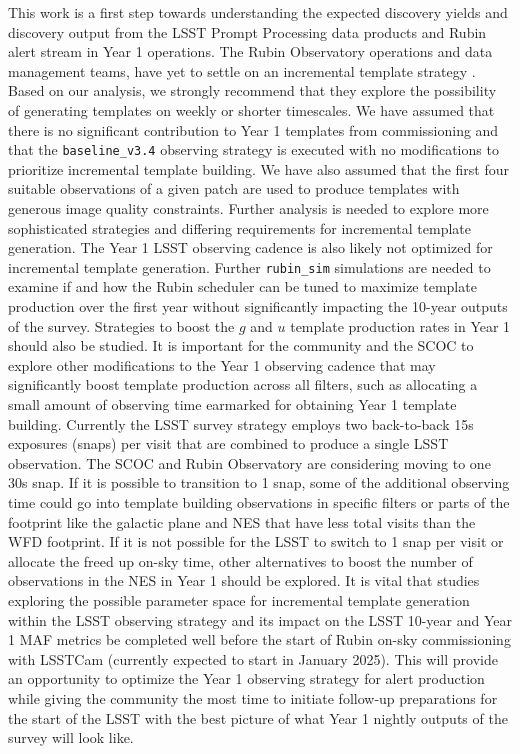 \documentclass[preprint,linenumbers]{aastex631}
\newcommand{\baseline}{\texttt{baseline\_v3.4}\xspace}
\begin{document}
{		This work is a first step towards understanding the expected discovery yields and discovery output from the LSST Prompt Processing data products and Rubin alert stream in Year 1 operations. 
		The Rubin Observatory operations and data management teams, have yet to settle on an incremental template strategy \citep{DMTN-107,RTN-011}. 
		Based on our analysis, we strongly recommend that they explore the possibility of generating templates on weekly or shorter timescales.  
		We have assumed that there is no significant contribution to Year 1 templates from commissioning and that the \baseline observing strategy is executed with no modifications to prioritize incremental template building. We have also assumed that the first four suitable observations of a given patch are used to produce templates with generous image quality constraints. 
		Further analysis is needed to explore more sophisticated strategies and differing requirements for incremental template generation. The Year 1 LSST observing cadence is also likely not optimized for incremental template generation.  
		Further \texttt{rubin\_sim} simulations are needed to examine if and how the Rubin scheduler can be tuned to maximize template production over the first year without significantly impacting the 10-year outputs of the survey. 
		Strategies to boost the $g$ and $u$ template production rates in Year 1 should also be studied. It is important for the community and the SCOC to explore other modifications to the Year 1 observing cadence  that may significantly boost template production  across all filters, such as allocating a small amount of observing time earmarked for obtaining Year 1 template building. 
		Currently the LSST survey strategy employs two back-to-back 15s exposures (snaps) per visit that are combined to produce a single LSST observation. The SCOC and Rubin Observatory are considering moving to one 30s snap. If it is possible to transition to 1 snap, some of the additional observing time could go into template building observations in specific filters or parts of the footprint like the galactic plane and NES that have less total visits than the WFD footprint. If it is not possible for the LSST to switch to 1 snap per visit or allocate the freed up on-sky time, other alternatives to boost the number of observations in the NES in Year 1 should be explored. It is vital that studies exploring the possible parameter space for incremental template generation within the LSST observing strategy and its impact on the LSST 10-year and Year 1 MAF metrics be completed well before the start of Rubin on-sky commissioning with LSSTCam (currently expected to start in January 2025). 
		This will provide an opportunity to optimize the Year 1 observing strategy for alert production while giving the community the most time to initiate follow-up preparations for the start of the LSST with the best picture of what Year 1 nightly outputs of the survey will look like.
		
}
\end{document}
